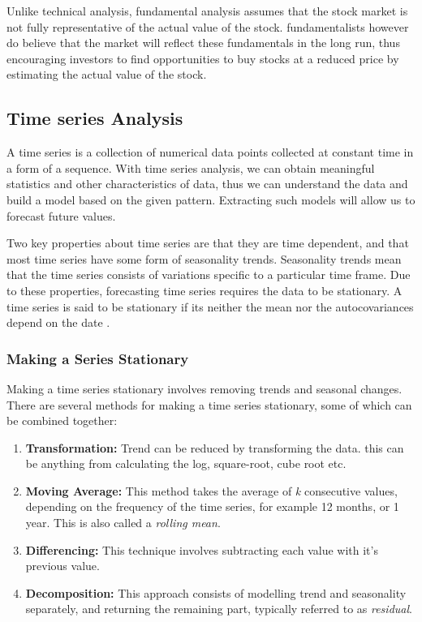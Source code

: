 \documentclass{UoYCSproject}
\begin{document}
Unlike technical analysis, fundamental analysis assumes that the stock market is not fully representative of the actual value of the stock. fundamentalists however do believe that the market will reflect these fundamentals in the long run, thus encouraging investors to find opportunities to buy stocks at a reduced price by estimating the actual value of the stock. 

\subsection{Time series Analysis}
A time series is a collection of numerical data points collected at constant time in a form of a sequence. With time series analysis, we can obtain meaningful statistics and other characteristics of data, thus we can understand the data and build a model based on the given pattern. Extracting such models will allow us to forecast future values. 

Two key properties about time series are that they are time dependent, and that most time series have some form of seasonality trends. Seasonality trends mean that the time series consists of variations specific to a particular time frame. Due to these properties, forecasting time series requires the data to be stationary. A time series is said to be stationary if its neither the mean nor the autocovariances depend on the date \cite{hamilton1994time}. 

\subsubsection{Making a Series Stationary}
Making a time series stationary involves removing trends and seasonal changes. There are several methods for making a time series stationary, some of which can be combined together:
\begin{enumerate}
    \item \textbf{Transformation:} Trend can be reduced by transforming the data. this can be anything from calculating the log, square-root, cube root etc.  
    \item \textbf{Moving Average:} This method takes the average of \textit{k} consecutive values, depending on the frequency of the time series, for example 12 months, or 1 year. This is also called a \textit{rolling mean}. 
    \item \textbf{Differencing:} This technique involves subtracting each value with it's previous value.
    \item \textbf{Decomposition:} This approach consists of modelling trend and seasonality separately, and returning the remaining part, typically referred to as \textit{residual}. 
\end{enumerate}
\end{document}
